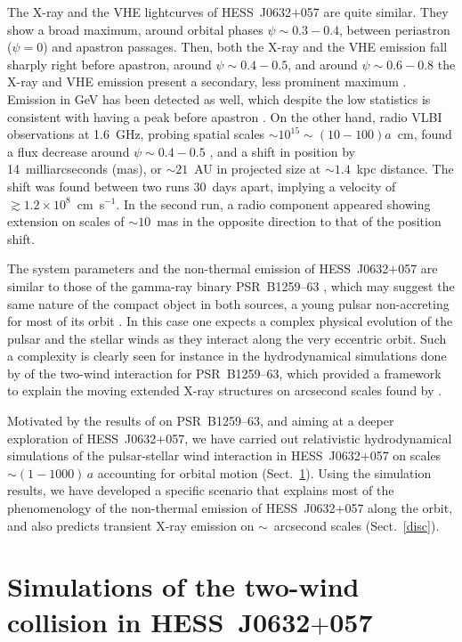 \documentclass[usenatbib]{mn2e}
\def\psr{{PSR~B1259--63}}
\def\j06{{HESS~J0632$+$057}}
\begin{document}
The X-ray and the VHE lightcurves of \j06 are quite similar. They show a broad maximum, around orbital phases $\psi\sim 0.3-0.4$, between periastron ($\psi=0$) and apastron passages. 
Then, both the X-ray and the VHE emission fall sharply right before apastron, around $\psi\sim 0.4-0.5$, and around $\psi\sim 0.6-0.8$ the X-ray and VHE emission present a secondary, 
less prominent maximum \citep[e.g.][]{ali14}. {Emission in GeV has been detected as well, which despite the low statistics is consistent with having a peak before apastron \citep{li17}.}
On the other hand, radio VLBI observations at 1.6~GHz, probing spatial scales $\sim 10^{15}\sim (10-100)a$~cm, found a flux decrease around $\psi\sim 0.4-0.5$ \citep{mol11b}, 
and a shift in position by 14~milliarcseconds (mas), or $\sim 21$~AU in projected size at $\sim 1.4$~kpc distance. The shift was found between two runs 30~days apart, implying a velocity 
of $\gtrsim 1.2\times 10^8$~cm~s$^{-1}$. In the second run, a radio component appeared showing extension on scales of $\sim 10$~mas in the opposite direction to that of the position shift. 

The system parameters and the non-thermal emission of \j06 are similar to those of the gamma-ray binary \psr{} \citep[see][and references therein]{dub13}, which may suggest the same nature of the compact object in both sources, a young pulsar non-accreting for most of its orbit \citep[see, however,][]{zam17}. In this case one expects a complex physical evolution of the pulsar and the stellar winds as they interact along the very eccentric orbit. Such a complexity is clearly seen for instance in the hydrodynamical simulations done by \cite{bb16} of the two-wind interaction for \psr{}, which provided a framework to explain the moving extended X-ray structures on arcsecond scales found by \cite{kargaltsev2014,phk15}. 

Motivated by the results of \cite{bb16} on \psr{}, and aiming at a deeper exploration of \j06, we have carried out relativistic hydrodynamical simulations of the pulsar-stellar wind interaction in \j06 on scales $\sim (1-1000)\,a$ accounting for orbital motion (Sect.~\ref{simu}). Using the simulation results, we have developed a specific scenario that explains most of the phenomenology of the non-thermal emission of \j06 along the orbit, and also predicts transient X-ray  emission on $\sim$~arcsecond scales (Sect.~\ref{disc}). 

\section{Simulations of the two-wind collision in \j06{}}\label{simu}
\end{document}
